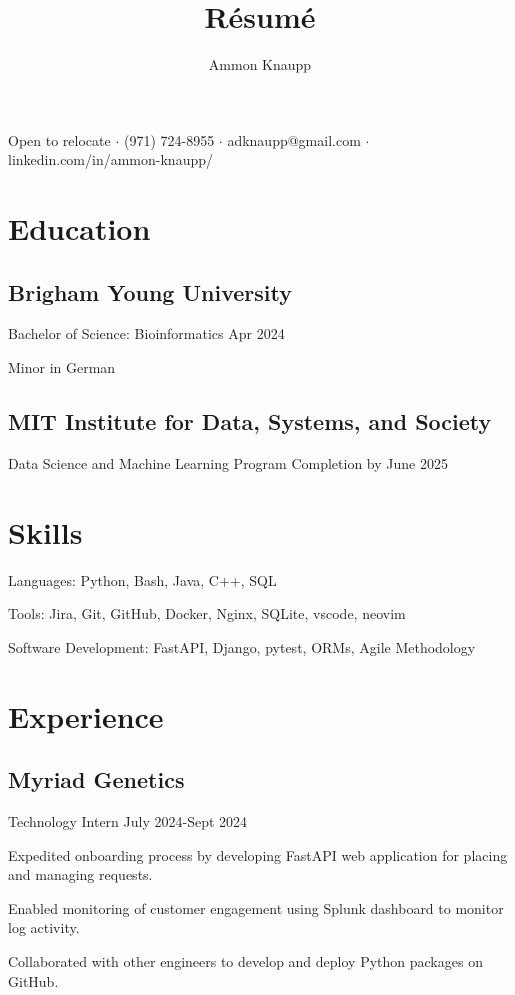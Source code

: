 \documentclass{article}
\makeatletter
\renewcommand{\maketitle}{
\begin{center}
  {\huge\bfseries\theauthor}
  \vspace{.25em}
  \par Open to relocate $\cdot$ (971) 724-8955 $\cdot$ adknaupp@gmail.com $\cdot$ linkedin.com/in/ammon-knaupp/
\end{center}
}
\newcommand{\role}[1]{
    \vspace{-\baselineskip}
    \vspace{8pt}
    #1
}
\makeatother
\begin{document}
\title{R\'esum\'e}
\author{Ammon Knaupp}

\maketitle

\section{Education}

\subsection{Brigham Young University}
\role{Bachelor of Science: Bioinformatics \hfill Apr 2024}
\begin{blacksquareitemize}
    \item Minor in German
\end{blacksquareitemize}

\subsection{MIT Institute for Data, Systems, and Society}
\role{Data Science and Machine Learning Program \hfill Completion by June 2025}

\section{Skills}

\begin{blacksquareitemize}
    \item Languages: Python, Bash, Java, C++, SQL
    \item Tools: Jira, Git, GitHub, Docker, Nginx, SQLite, vscode, neovim
    \item Software Development: FastAPI, Django, pytest, ORMs, Agile Methodology
\end{blacksquareitemize}

\section{Experience}

\subsection{Myriad Genetics}
\role{Technology Intern \hfill July 2024-Sept 2024}
\begin{blacksquareitemize}\itemsep1pt
    \item Expedited onboarding process by developing FastAPI web application for placing and managing requests.
    \item Enabled monitoring of customer engagement using Splunk dashboard to monitor log activity.
    \item Collaborated with other engineers to develop and deploy Python packages on GitHub.
\end{blacksquareitemize}
\end{document}
